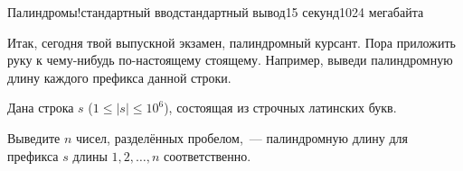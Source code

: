 \begin{problem}{Палиндромы!}{стандартный ввод}{стандартный вывод}{15 секунд}{1024 мегабайта}

Итак, сегодня твой выпускной экзамен, палиндромный курсант. Пора приложить руку к чему-нибудь по-настоящему стоящему. Например, выведи палиндромную длину каждого префикса данной строки.

\InputFile
Дана строка $s$ ($1 \le |s| \le 10^6$), состоящая из строчных латинских букв.

\OutputFile
Выведите $n$ чисел, разделённых пробелом,~--- палиндромную длину для префикса $s$ длины $1, 2, \ldots, n$ соответственно.


\end{problem}


